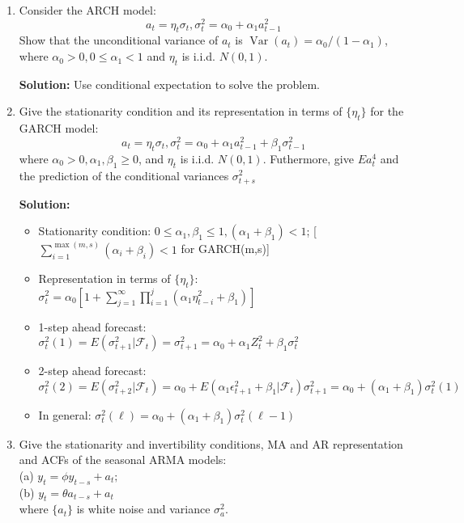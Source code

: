 \documentclass{article}
\begin{document}
\begin{enumerate}
	\item Consider the ARCH model:\\
	\begin{equation*}
	a_{t}=\eta_{t} \sigma_{t}, \sigma_{t}^{2}=\alpha_{0}+\alpha_{1} a_{t-1}^{2}
	\end{equation*}
	Show that the unconditional variance of $a_t$ is $\operatorname{Var}\left(a_{t}\right)=\alpha_{0} /\left(1-\alpha_{1}\right)$,\\ where $\alpha_{0}>0,0 \leq \alpha_{1}<1$ and $\eta_t$ is i.i.d. $N(0, 1)$.
	
	\textbf{Solution:} Use conditional expectation to solve the problem.
	
	\item Give the stationarity condition and its representation in terms of $\{\eta_t\}$ for the GARCH model:
	\begin{equation*}
	a_{t}=\eta_{t} \sigma_{t}, \sigma_{t}^{2}=\alpha_{0}+\alpha_{1} a_{t-1}^{2}+\beta_{1} \sigma_{t-1}^{2}
	\end{equation*}
	where $\alpha_{0}>0, \alpha_{1}, \beta_{1} \geq 0$, and $\eta_t$ is i.i.d. $N(0, 1)$. Futhermore, give $Ea_t^4$ and the prediction of the conditional variances $\sigma_{t+s}^2$
	
	\textbf{Solution:}
	\begin{itemize}
		\item Stationarity condition: $0 \leq \alpha_{1}, \beta_{1} \leq 1,\left(\alpha_{1}+\beta_{1}\right)<1$; [$\sum_{i=1}^{\max (m, s)}\left(\alpha_{i}+\beta_{i}\right)<1$ for GARCH(m,s)]
		\item Representation in terms of $\{\eta_t\}$: $\sigma_{t}^{2}=\alpha_{0}\left[1+\sum_{j=1}^{\infty} \prod_{i=1}^{j}\left(\alpha_{1} \eta_{t-i}^{2}+\beta_{1}\right)\right]$
		\item 1-step ahead forecast: $\sigma_{t}^{2}(1)=E\left(\sigma_{t+1}^{2} | \mathcal{F}_{t}\right)=\sigma_{t+1}^{2}=\alpha_{0}+\alpha_{1} Z_{t}^{2}+\beta_{1} \sigma_{t}^{2}$
		\item 2-step ahead forecast: $\sigma_{t}^{2}(2)=E\left(\sigma_{t+2}^{2} | \mathcal{F}_{t}\right)=\alpha_{0}+E\left(\alpha_{1} \epsilon_{t+1}^{2}+\beta_{1} | \mathcal{F}_{t}\right) \sigma_{t+1}^{2}=\alpha_{0}+\left(\alpha_{1}+\beta_{1}\right) \sigma_{t}^{2}(1)$
		\item In general: $\sigma_{t}^{2}(\ell)=\alpha_{0}+\left(\alpha_{1}+\beta_{1}\right) \sigma_{t}^{2}(\ell-1)$
	\end{itemize}

	\item Give the stationarity and invertibility conditions, MA and AR representation and ACFs of the seasonal ARMA models:\\
	(a) $y_{t}=\phi y_{t-s}+a_{t};$\\
	(b) $y_{t}=\theta a_{t-s}+a_{t}$\\
	where $\{a_t\}$ is white noise and variance $\sigma_a^2$.
	

\end{enumerate}
\end{document}
